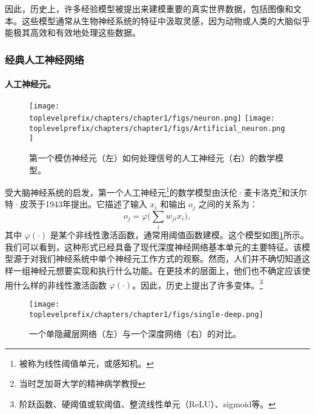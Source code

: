 \documentclass[../../book-main_zh.tex]{subfiles}
\begin{document}
因此，历史上，许多经验模型被提出来建模重要的真实世界数据，包括图像和文本。这些模型通常从生物神经系统的特征中汲取灵感，因为动物或人类的大脑似乎能极其高效和有效地处理这些数据。

\subsubsection{经典人工神经网络}
\paragraph{人工神经元。}

\begin{figure}[t]
    \centering
\texttt{[image: \\toplevelprefix/chapters/chapter1/figs/neuron.png]} \hspace{3mm}   
\texttt{[image: \\toplevelprefix/chapters/chapter1/figs/Artificial\_neuron.png]}
    \caption{第一个模仿神经元（左）如何处理信号的人工神经元（右）的数学模型。}
    \label{fig:neuron}
\end{figure}

受大脑神经系统的启发，第一个人工神经元\footnote{被称为线性阈值单元，或感知机。}的数学模型由沃伦·麦卡洛克\footnote{当时芝加哥大学的精神病学教授}和沃尔特·皮茨于1943年提出\cite{McCulloch-Pitts}。它描述了输入 $x_i$ 和输出 $o_j$ 之间的关系为：
\begin{equation}
    o_j = \varphi\Big( \sum_i w_{ji}x_i\Big),  
\end{equation}
其中 $\varphi(\cdot)$ 是某个非线性激活函数，通常用阈值函数建模。这个模型如图\ref{fig:neuron}所示。我们可以看到，这种形式已经具备了现代深度神经网络基本单元的主要特征。该模型源于对我们神经系统中单个神经元工作方式的观察。然而，人们并不确切知道这样一组神经元想要实现和执行什么功能。在更技术的层面上，他们也不确定应该使用什么样的非线性激活函数 $\varphi(\cdot)$。因此，历史上提出了许多变体。\footnote{阶跃函数、硬阈值或软阈值、整流线性单元（ReLU）、sigmoid等。
}

\begin{figure}[t]
\centering
\texttt{[image: \\toplevelprefix/chapters/chapter1/figs/single-deep.png]}
    \caption{一个单隐藏层网络（左）与一个深度网络（右）的对比。}
    \label{fig:single-deep}
\end{figure}
\end{document}
